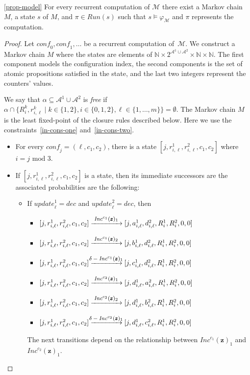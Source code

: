 \documentclass[a4paper,UKenglish,cleveref, autoref, thm-restate]{lipics-v2021}
\newcommand{\N}{\mathbb{N}}
\newcommand{\A}{\mathcal{A}}
\newcommand{\M}{\mathcal{M}}
\newcommand{\run}{\textit{Run}}
\newcommand{\tran}[1]{\xrightarrow{\makebox[4em]{\footnotesize$#1$}}}
\newcommand{\INC}{\mathit{Inc}}
\renewcommand{\vec}[1]{\pmb{#1}}
\newcommand{\update}{\textit{update}}
\newcommand{\Dec}{\textit{dec}}
\newcommand{\conf}{\textit{conf}}
\newcommand{\vv}[1]{\INC^{#1}(\vec{z})}
\begin{document}
\begin{customprop}{\ref{prop-model}}
    For every recurrent computation of $\M$ there exist a Markov chain $M$, a state $s$ of $M$, and $\pi \in \run(s)$ such that $s \models \varphi_\M$ and $\pi$ represents the computation.
\end{customprop}
\begin{proof}
   Let $\conf_0,\conf_1,\ldots$ be a recurrent computation of~$\M$. We construct a Markov chain $M$ where the states are elements of $\N \times 2^{\A^1 \cup \A^2} \times \N \times \N$. The first component models the configuration index, the second components is the set of atomic propositions satisfied in the state, and the last two integers represent the counters' values. 

   We say that $\alpha \subseteq \A^1 \cup \A^2$ is \emph{free} if 
   $\alpha \cap \{R^k_i, r^k_{i,\ell} \mid k \in \{1,2\}, i \in \{0,1,2\}, \ell \in \{1,\ldots,m\}\} = \emptyset$. The Markov chain $M$ is the least fixed-point of the closure rules described below. Here we use the constraints~\eqref{in-cons-one} and~\eqref{in-cons-two}. 
   \begin{itemize}
    \item For every $\conf_j = (\ell,c_1,c_2)$, there is a state $[j,r^1_{i,\ell},r^2_{i,\ell},c_1,c_2]$ where $i = j \mbox{ mod } 3$. 
    \item If $[j,r^1_{i,\ell},r^2_{i,\ell},c_1,c_2]$ is a state, then its immediate successors are the associated probabilities are the following:
    \begin{itemize}
        \item If $\update_\ell^1 = \Dec$ and $\update_\ell^2 = \Dec$, then
           \begin{itemize}
            \item $[j,r^1_{i,\ell},r^2_{i,\ell},c_1,c_2] \tran{\vv{c_1}_1} 
                   [j,a^1_{i,\ell},d^2_{i,\ell},R_i^1,R_i^2,0,0]$
            \item $[j,r^1_{i,\ell},r^2_{i,\ell},c_1,c_2] \tran{\vv{c_1}_2} 
                   [j,b^1_{i,\ell},d^2_{i,\ell},R_i^1,R_i^2,0,0]$    
            \item $[j,r^1_{i,\ell},r^2_{i,\ell},c_1,c_2] \tran{\delta- \vv{c_1}_1}
                   [j,c^1_{i,\ell},d^2_{i,\ell},R_i^1,R_i^2,0,0]$
\item $[j,r^1_{i,\ell},r^2_{i,\ell},c_1,c_2] \tran{\vv{c_2}_1} 
                   [j,d^1_{i,\ell},a^2_{i,\ell},R_i^1,R_i^2,0,0]$
            \item $[j,r^1_{i,\ell},r^2_{i,\ell},c_1,c_2] \tran{\vv{c_2}_2} 
                   [j,d^1_{i,\ell},b^2_{i,\ell},R_i^1,R_i^2,0,0]$    
            \item $[j,r^1_{i,\ell},r^2_{i,\ell},c_1,c_2] \tran{\delta- \vv{c_2}_1} 
                   [j,d^1_{i,\ell},c^2_{i,\ell},R_i^1,R_i^2,0,0]$
\end{itemize}
        The next transitions depend on the relationship between $\vv{c_1}_1$ and $\vv{c_2}_1$. 
        

\end{itemize}
\end{itemize}
\end{proof}
\end{document}
